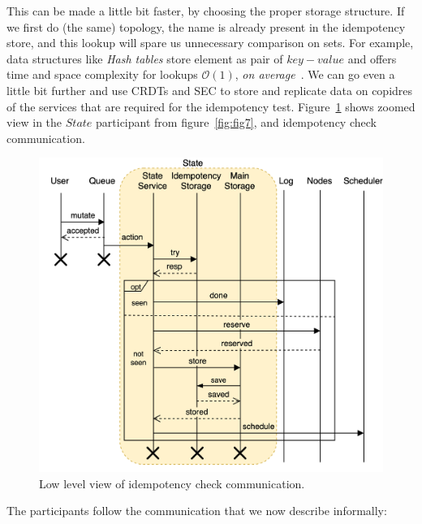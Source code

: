 This can be made a little bit faster, by choosing the proper storage structure. If we first do (the same) topology, the name is already present in the idempotency store, and this lookup will spare us unnecessary comparison on sets. For example, data structures like \emph{Hash tables} store element as pair of $key-value$ and offers time and space complexity for lookups $\mathcal{O}(1)$, \textit{on average}~\cite{0023376}.  We can go even a little bit further and use CRDTs and SEC to store and replicate data on copidres of the services that are required for the idempotency test. Figure~\ref{fig:fig13} shows zoomed view in the $State$ participant from figure~\ref{fig:fig7}, and idempotency check communication.
\begin{figure}[H]
	\begin{center}
		\includegraphics[scale=0.6]{images/Figure13}
	\end{center}
	\vspace{-0.7cm}
	\caption{Low level view of idempotency check communication.}
	\label{fig:fig13}
\end{figure}

\noindent
The participants follow the communication that we now describe informally: \label{informal_description_idempotency}

